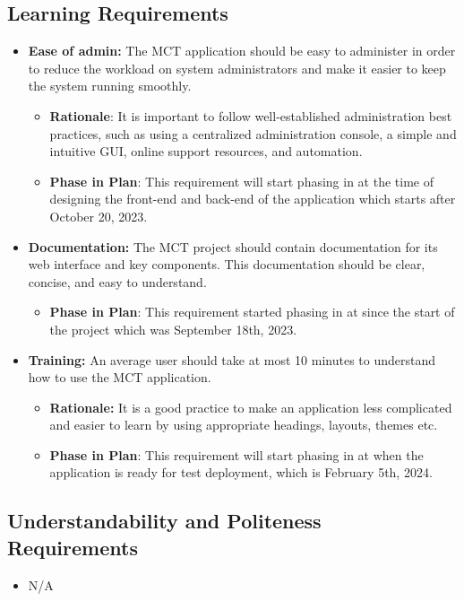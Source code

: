 \documentclass[12pt]{article}
\begin{document}
\subsection{Learning Requirements}
\begin{itemize}
    \item 
\textbf{Ease of admin:} The MCT application should be easy to administer in order to reduce the workload on system administrators and make it easier to keep the system running smoothly.
\begin{itemize}
    \item \textbf{Rationale}: It is important to follow well-established administration best practices, such as using a centralized administration console, a simple and intuitive GUI, online support resources, and automation.
    \item \textbf{Phase in Plan}: This requirement will start phasing in at the time of designing the front-end and back-end of the application which starts after October 20, 2023.
\end{itemize}
\item 
\textbf{Documentation: }The MCT project should contain documentation for its web interface and key components. This documentation should be clear, concise, and easy to understand.
\begin{itemize}
    \item \textbf{Phase in Plan}: This requirement started phasing in at since the start of the project which was September 18th, 2023.
\end{itemize}
\item 
\textbf{Training: }An average user should take at most 10 minutes to understand how to use the MCT application.
\begin{itemize}
    \item \textbf{Rationale: }It is a good practice to make an application less complicated and easier to learn by using appropriate headings, layouts, themes etc.
    \item \textbf{Phase in Plan}: This requirement will start phasing in at when the application is ready for test deployment, which is February 5th, 2024.
\end{itemize}






\end{itemize}
\subsection{Understandability and Politeness Requirements}
\begin{itemize}
    \item N/A
\end{itemize}
\end{document}
